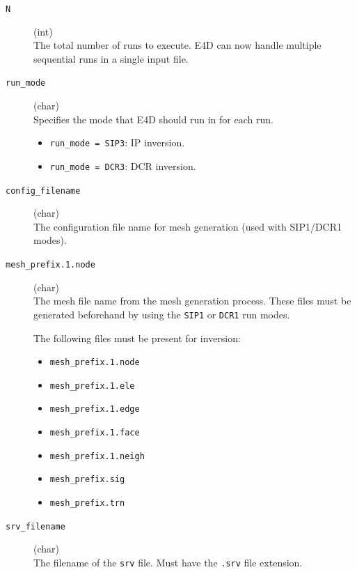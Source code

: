 \documentclass[a4paper,12pt]{article}
\begin{document}
\begin{description}
    \item[\texttt{N}] (int)\hfill \\
          The total number of runs to execute. E4D can now handle multiple sequential runs in a single input file.

    \item[\texttt{run\_mode}] (char)\hfill \\
          Specifies the mode that E4D should run in for each run.
          \begin{itemize}
              \item \texttt{run\_mode = SIP3}: IP inversion.
              \item \texttt{run\_mode = DCR3}: DCR inversion.
          \end{itemize}

    \item[\texttt{config\_filename}] (char)\hfill \\
          The configuration file name for mesh generation (used with SIP1/DCR1 modes).

    \item[\texttt{mesh\_prefix.1.node}] (char)\hfill \\
          The mesh file name from the mesh generation process. These files must be generated beforehand by using the \texttt{SIP1} or \texttt{DCR1} run modes.

          The following files must be present for inversion:
          \begin{itemize}
              \item \texttt{mesh\_prefix.1.node}
              \item \texttt{mesh\_prefix.1.ele}
              \item \texttt{mesh\_prefix.1.edge}
              \item \texttt{mesh\_prefix.1.face}
              \item \texttt{mesh\_prefix.1.neigh}
              \item \texttt{mesh\_prefix.sig}
              \item \texttt{mesh\_prefix.trn}
          \end{itemize}

    \item[\texttt{srv\_filename}] (char)\hfill \\
          The filename of the \texttt{srv} file. Must have the \texttt{.srv} file extension.


\end{description}
\end{document}
